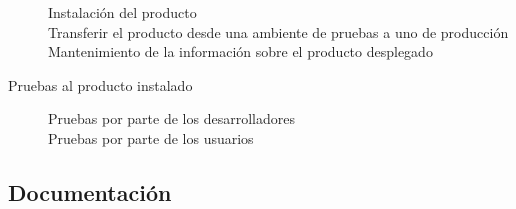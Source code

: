 \begin{description}
\begin{description}
			\item [Instalación del producto]
			\item [Transferir el producto desde una ambiente de pruebas a uno de producción]
			\item [Mantenimiento de la información sobre el producto desplegado]
		\end{description}
	\item [Pruebas al producto instalado]
		\begin{description}
			\item [Pruebas por parte de los desarrolladores]
			\item [Pruebas por parte de los usuarios]
		\end{description}
\end{description}

\subsection{Documentación}\label{sec:doc}


